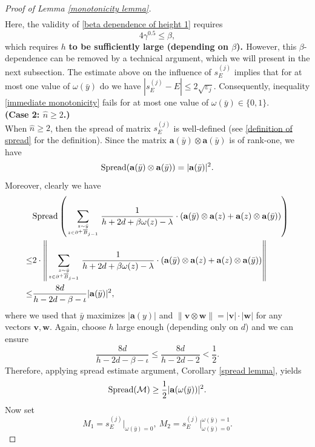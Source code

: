 \documentclass[11pt,reqno,UTF8,twoside]{amsart}
\newcommand{\bfa}{\mathbf{a}}
\newcommand{\spread}{{\rm Spread}}
\newcommand{\mcM}{\mathcal{M}}
\newcommand{\whn}{\widehat{n}}
\newcommand{\barB}{\overline{B}}
\newcommand{\smallSj}{s^{(j)}}
\theoremstyle{definition}
\numberwithin{equation}{section}
\begin{document}
\begin{proof}[Proof of Lemma \ref{monotonicity lemma}]
\begin{align}
\end{align}
Here, the validity of \eqref{beta dependence of height 1} requires 
\[4\gamma^{0.5}\leq \beta,\]
which requires  $h$ \textbf{{to be sufficiently large (depending on $\beta$). } } However, this $\beta$-dependence can be removed by a technical argument, which we will present in the next subsection. 
The estimate above on the influence of $\smallSj_E$ implies that for at most one value of $\omega(\bar{y})$ do we have $|\smallSj_E-E|\leq 2\sqrt{\varepsilon_j}$. Consequently, inequality \eqref{immediate monotonicity} fails for at most one value of $\omega(\bar{y})\in \{0,1\}$. \\ 

\noindent \textbf{(Case 2: $\whn\geq 2$.)}\\

\noindent When $\whn\geq 2$, then the spread of matrix $\smallSj_E$ is well-defined (see \eqref{definition of spread} for the definition). Since the matrix $\bfa(\bar{y})\otimes \bfa(\bar{y})$ is of rank-one, we have 
\[\spread (\bfa(\bar{y})\otimes \bfa(\bar{y}))=|\bfa(\bar{y})|^2.\]
Moreover, clearly we have 
\begin{align*}
 & \spread\left( \sum_{z\sim \bar{y} \atop z\in \partial^+\barB_{j-1}} \frac{1}{h+2d+\beta\omega(z)-\lambda } \cdot(\bfa(\bar{y}) \otimes  \bfa(z)+\bfa(z)\otimes\bfa(\bar{y})  ) \right) \\
 \leq & 2\cdot \left\| \sum_{z\sim \bar{y} \atop z\in \partial^+\barB_{j-1}} \frac{1}{h+2d+\beta\omega(z)-\lambda } \cdot(\bfa(\bar{y}) \otimes  \bfa(z)+\bfa(z)\otimes\bfa(\bar{y})  ) \right\| \\
 \leq &  \frac{8d}{h-2d-\beta-\iota} |\bfa(\bar{y})|^2,
\end{align*}
where we used that $\bar{y}$ maximizes $|\bfa(y)|$ and $\|\mathbf{v}\otimes \mathbf{w} \|=|\mathbf{v} |\cdot |\mathbf{w}|$ for any vectors  $\mathbf{v},\mathbf{w}$. Again, choose $h$ large enough  (depending only on $d$) and we can ensure 
\begin{equation}\label{essential barrier high 6}
  \frac{8d}{h-2d-\beta-\iota} \leq \frac{8d}{h-2d-2}<\frac{1}{2}.
\end{equation}
Therefore, applying  spread estimate argument, Corollary \ref{spread lemma}, yields
\begin{equation}\label{spread of mcM}
 \spread(\mcM)\geq \frac{1}{2}|\bfa(\omega(\bar{y}))|^2.
\end{equation}
Now set 
\[M_1=\smallSj_E \big|_{\omega(\bar{y})=0},\ M_2 = \smallSj_E \big|_{\omega(\bar{y})=0}^{\omega(\bar{y})=1}. \]

\end{proof}
\end{document}
